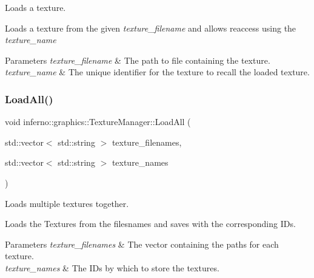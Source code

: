 Loads a texture. 

Loads a texture from the given {\itshape texture\+\_\+filename} and allows reaccess using the {\itshape texture\+\_\+name} 
\begin{DoxyParams}{Parameters}
{\em texture\+\_\+filename} & The path to file containing the texture. \\
\hline
{\em texture\+\_\+name} & The unique identifier for the texture to recall the loaded texture. \\
\hline
\end{DoxyParams}
\mbox{\label{classinferno_1_1graphics_1_1_texture_manager_ae1c0a268b96073bb0c925e3523f2bc58}} 
\subsubsection{\texorpdfstring{Load\+All()}{LoadAll()}}
{\footnotesize\ttfamily void inferno\+::graphics\+::\+Texture\+Manager\+::\+Load\+All (\begin{DoxyParamCaption}\item[{std\+::vector$<$ std\+::string $>$}]{texture\+\_\+filenames,  }\item[{std\+::vector$<$ std\+::string $>$}]{texture\+\_\+names }\end{DoxyParamCaption})}



Loads multiple textures together. 

Loads the Textures from the filesnames and saves with the corresponding I\+Ds. 
\begin{DoxyParams}{Parameters}
{\em texture\+\_\+filenames} & The vector containing the paths for each texture. \\
\hline
{\em texture\+\_\+names} & The I\+Ds by which to store the textures. \\
\hline
\end{DoxyParams}
\mbox{\label{classinferno_1_1graphics_1_1_texture_manager_a328ab24dd273a41437c23abafbf978c0}} 
